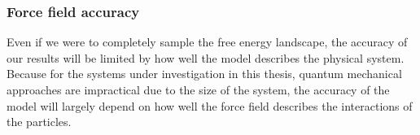 \documentclass{report}
\begin{document}
\subsubsection{Force field accuracy}

Even if we were to completely sample the free energy landscape, the accuracy of our results will be limited by how well the model describes the physical system. Because for the systems under investigation in this thesis, quantum mechanical approaches are impractical due to the size of the system, the accuracy of the model will largely depend on how well the force field describes the interactions of the particles.






\end{document}
